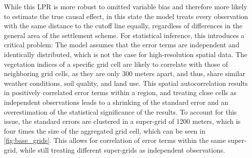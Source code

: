 While this LPR is more robust to omitted variable bias and therefore more likely to estimate the true causal effect,
in this state the model treats every observation with the same distance to the cutoff line equally, regardless of differences in the general area of the settlement scheme.
For statistical inference, this introduces a critical problem: The model assumes that the error terms are independent and identically distributed, which is not the case for high-resolution spatial data.
The vegetation indices of a specific grid cell are likely to correlate with those of neighboring grid cells, as they are only 300 meters apart, and thus, share similar weather conditions, soil quality, and land use.
This spatial autocorrelation results in positively correlated error terms within a region,
and treating close cells as independent observations leads to a shrinking of the standard error and an overestimation of the statistical significance of the results.
To account for this issue, the standard errors are clustered in a super-grid of 1200 meters, which is four times the size of the aggregated grid cell, which can be seen in \cref{fig:base_grids}.
This allows for correlation of error terms within the same super-grid, while still treating different super-grids as independent observations.